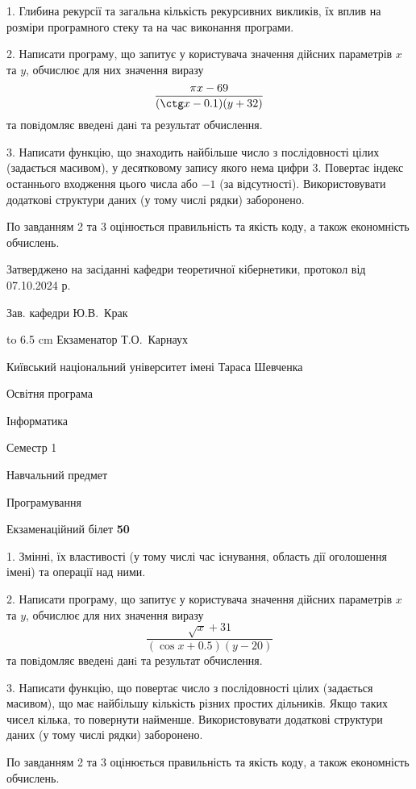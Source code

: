 \documentclass[12pt, ukrainian]{article}
\begin{document}
{%
1. Глибина рекурсії та загальна кількість рекурсивних викликів, їх вплив на розміри програмного стеку та на час виконання програми.%
\par
2. Написати програму, що запитує у користувача значення дійсних параметрів $x$ та $y$, обчислює для них значення виразу 
$$\frac{\pi x - 69}{(\ctg x - 0.1) (y + 32)}$$ 
та повiдомляє введенi данi та результат обчислення.

\par
3. Написати функцію, що знаходить найбільше число з послідовності цілих (задається масивом), у десятковому запису якого нема цифри 3. Повертає індекс останнього входження цього числа або $-1$ (за відсутності). Використовувати додаткові структури даних (у тому числі рядки) заборонено.

По завданням 2 та 3 оцінюється правильність та якість коду, а також економність обчислень.

}
{\smallskip\smallskip \begin {scriptsize} Затверджено на засіданні кафедри теоретичної кібернетики, протокол   від   07.10.2024 р.\par\smallskip\smallskip\smallskip\smallskip
{\parbox {6.5 cm} {Зав. кафедри \dotfill Ю.В.~Крак}}\hspace {0.7cm} {\hbox to 6.5 cm { Екзаменатор \dotfill Т.О.~Карнаух}} \end{scriptsize}}
\vspace{0.9cm}
{{\begin {scriptsize}\par
{ \center  Київський національний університет імені Тараса Шевченка \par}
{\parbox {5 cm}{Освітня програма \hfill}{\parbox {7 cm}{Інформатика\hfill}}\parbox {6 cm}{\hfill Семестр 1}}\par
{\parbox {5 cm} {Навчальний предмет \hfill}\parbox {7 cm}{Програмування \hfill}\parbox {6cm}{\hfill}\par}\vspace{-15pt} \end{scriptsize}}{\center Екзаменаційний білет \No \textbf { 50 }\par}}
{%
1. Змінні, їх властивості (у тому числі час існування, область дії оголошення імені) та операції над ними.%
\par
2. Написати програму, що запитує у користувача значення дійсних параметрів $x$ та $y$, обчислює для них значення виразу 
$$\frac{\sqrt x + 31}{(\cos x + 0.5) (y - 20)}$$ 
та повiдомляє введенi данi та результат обчислення.

\par
3. Написати функцію, що повертає число з послідовності цілих (задається масивом), що має найбільшу кількість різних простих дільників. Якщо таких чисел кілька, то повернути найменше. Використовувати додаткові структури даних (у тому числі рядки) заборонено.

По завданням 2 та 3 оцінюється правильність та якість коду, а також економність обчислень.

}
\end{document}
